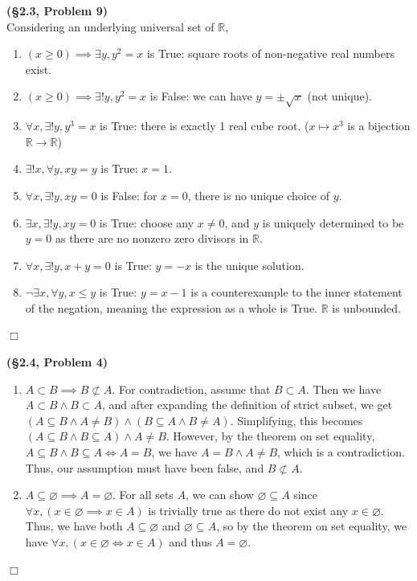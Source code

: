 \documentclass[12pt]{article}
\theoremstyle{definition}
\newenvironment{Solution}{\noindent {\sc Solution.}}{$\Box$ \vspace{2 ex}}
\begin{document}
\begin{Solution}
{\bf (\S2.3, Problem 9)}\\
Considering an underlying universal set of $\mathbb{R}$, 
\begin{enumerate}[label=\alph*.]
\item $(x\ge 0) \implies \exists y, y^2 = x$ is True: square roots of non-negative real numbers exist.
\item $(x\ge 0) \implies \exists!y,y^2=x$ is False: we can have $y=\pm \sqrt{x}$ (not unique).
\item $\forall x, \exists!y, y^3 = x$ is True: there is exactly 1 real cube root. ($x \mapsto x^3$ is a bijection $\mathbb{R}\to \mathbb{R}$)
\item $\exists!x, \forall y, xy=y$ is True: $x=1$.
\item $\forall x, \exists!y, xy=0$ is False: for $x=0$, there is no unique choice of $y$.
\item $\exists x, \exists!y,xy=0$ is True: choose any $x\ne 0$, and $y$ is uniquely determined to be $y=0$ as there are no nonzero zero divisors in $\mathbb{R}$.
\item $\forall x, \exists! y, x+y=0$ is True: $y=-x$ is the unique solution.
\item $\lnot\exists x,\forall y, x \le y$ is True: $y=x-1$ is a counterexample to the inner statement of the negation, meaning the expression as a whole is True. $\mathbb{R}$ is unbounded.
\end{enumerate}
\end{Solution} 


\vspace{1cm}
\newpage{}
\begin{Solution}
{\bf (\S2.4, Problem 4)}\\
\begin{enumerate}[label=\alph*.]
\item $A \subset B \implies B \not\subset A$. For contradiction, assume that $B \subset A$. Then we have $A \subset B\land B\subset A$, and after expanding the definition of strict subset, we get $(A \subseteq B \land A\ne B) \land (B \subseteq A\land B \ne A)$. Simplifying, this becomes $(A\subseteq B\land B\subseteq A)\land A\ne B$. However, by the theorem on set equality, $A \subseteq B \land B\subseteq A\iff A =B$, we have $A = B\land A \ne B$, which is a contradiction. Thus, our assumption must have been false, and $B \not\subset A$.
\item $A \subseteq \varnothing \implies A =\varnothing$. For all sets $A$, we can show $\varnothing \subseteq A$ since $\forall x, (x \in \varnothing \implies x\in A)$ is trivially true as there do not exist any $x \in \varnothing$. Thus, we have both $A \subseteq \varnothing$ and $\varnothing \subseteq A$, so by the theorem on set equality, we have $\forall x, (x \in \varnothing \iff x \in A)$ and thus $A = \varnothing$.
\end{enumerate}
\end{Solution} 
\end{document}

